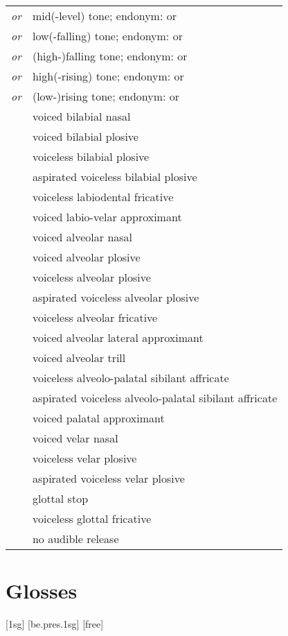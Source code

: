 \documentclass{article}
\begin{document}
\begin{xltabular}{\textwidth}{lL}
   \textit{or} \ipa{\={}} & mid(-level) tone; endonym:  or  \\
   \textit{or} \ipa{\`{}} & low(-falling) tone; endonym:  or  \\
   \textit{or} \ipa{\^{}} & (high-)falling tone; endonym:  or  \\
   \textit{or} \ipa{\'{}} & high(-rising) tone; endonym:  or  \\
   \textit{or} \ipa{\v{}} & (low-)rising tone; endonym:  or  \\
   & voiced bilabial nasal \\
   & voiced bilabial plosive \\
   & voiceless bilabial plosive \\
   & aspirated voiceless bilabial plosive \\
   & voiceless labiodental fricative \\
   & voiced labio-velar approximant \\
   & voiced alveolar nasal \\
   & voiced alveolar plosive \\
   & voiceless alveolar plosive \\
   & aspirated voiceless alveolar plosive \\
   & voiceless alveolar fricative \\
   & voiced alveolar lateral approximant \\
   & voiced alveolar trill \\
  \ipa{\texttctclig} & voiceless alveolo-palatal sibilant affricate \\
   & aspirated voiceless alveolo-palatal sibilant affricate\\
   & voiced palatal approximant \\
   & voiced velar nasal \\
   & voiceless velar plosive \\
   & aspirated voiceless velar plosive \\
   & glottal stop \\
   & voiceless glottal fricative \\
  \ipa{\textcorner} & no audible release \\
\end{xltabular}

\newpage\section{Glosses}

\ex[lingstyle=custom_nlevel]
\begingl
{}[{\sc 1sg}]
[be.{\sc pres.1sg}]
[free]
\endgl
\xe
\end{document}
